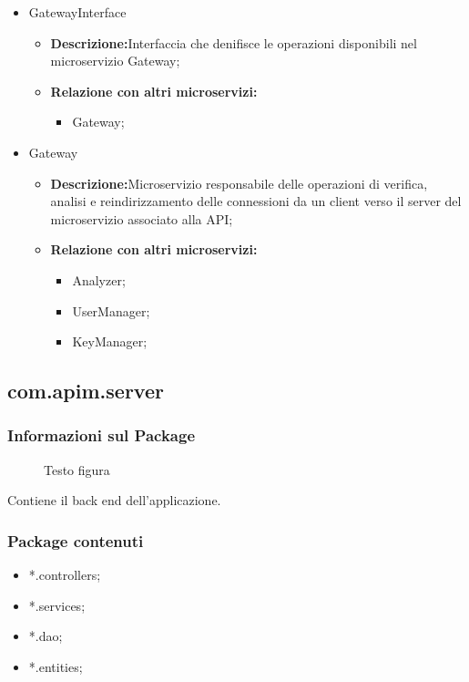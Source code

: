 {\begin{itemize}
\begin{itemize}
    \item \textbf{Relazione con altri microservizi:}
  \end{itemize}
\item GatewayInterface
  \begin{itemize}
  \item \textbf{Descrizione:}Interfaccia che denifisce le operazioni disponibili nel microservizio Gateway;
    \item \textbf{Relazione con altri microservizi:}
      \begin{itemize}
      \item Gateway;
      \end{itemize}
  \end{itemize}
\item Gateway
  \begin{itemize}
  \item \textbf{Descrizione:}Microservizio responsabile delle operazioni di verifica, analisi e reindirizzamento delle connessioni da un client verso il server del microservizio associato alla API;
    \item \textbf{Relazione con altri microservizi:}
      \begin{itemize}
      \item Analyzer;
        \item UserManager;
        \item KeyManager;
      \end{itemize}
  \end{itemize}

\end{itemize}

  \subsection{com.apim.server}{
    \subsubsection{Informazioni sul Package}
        \begin{figure}[ht]
          \centering
          \caption{Testo figura}
          \label{Testo figura}
        \end{figure}
        Contiene il back end dell'applicazione.
        \subsubsection{Package contenuti}
        \begin{itemize} \itemsep1pt
        \item *.controllers;
        \item *.services;
        \item *.dao;
        \item *.entities;
        \end{itemize}
}}
